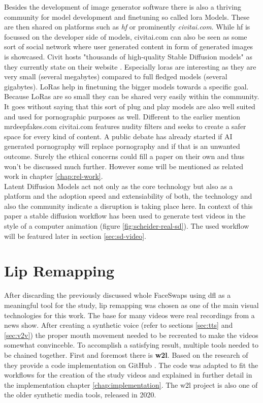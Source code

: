\documentclass[
  a4paper,  %
  twoside,  %
  bibliography=totoc,
  headsepline,
  cleardoublepage=empty,
  parskip=half,
  draft=false
]{scrbook}
\begin{document}
Besides the development of image generator software there is also a thriving community for model development and finetuning so called \gls{lora} Models. These are then shared on platforms such as \textit{\gls{hf}} or prominently \textit{civitai.com}. While \gls{hf} is focussed on the developer side of models, civitai.com can also be seen as some sort of social network where user generated content in form of generated images is showcased. Civit hosts "thousands of high-quality Stable Diffusion models" as they currently state on their website \cite{CivitaiHomeOpenSource}. Especially \gls{lora}s are interesting as they are very small (several megabytes) compared to full fledged models (several gigabytes). LoRas help in finetuning the bigger models towards a specific goal. Because LoRas are so small they can be shared very easily within the community. It goes without saying that this sort of plug and play models are also well suited and used for pornographic purposes as well. Different to the earlier mention mrdeepfakes.com civitai.com features nudity filters and seeks to create a safer space for every kind of content. A public debate has already started if AI generated pornography will replace pornography and if that is an unwanted outcome. Surely the ethical concerns could fill a paper on their own and thus won't be discussed much further. However some will be mentioned as related work in chapter \ref{chap:rel-work}.\\
Latent Diffusion Models act not only as the core technology but also as a platform and the adoption speed and extensiability of both, the technology and also the community indicate a disruption is taking place here.
In context of this paper a stable diffusion workflow has been used to generate test videos in the style of a computer animation (figure \ref{fig:scheider-real-sd}). The used workflow will be featured later in section \ref{sec:sd-video}. 

\section{Lip Remapping}
\label{sec:lips}
After discarding the previously discussed whole FaceSwaps using \gls{dfl} as a meaningful tool for the study, lip remapping was chosen as one of the main visual technologies for this work. The base for many videos were real recordings from a news show. After creating a synthetic voice (refer to sections \ref{sec:tts} and \ref{sec:v2v}) the proper mouth movement needed to be recreated to make the videos somewhat convinceble. To accomplish a satisfying result, multiple tools needed to be chained together. First and foremost there is \textbf{\gls{w2l}}. Based on the research of \citet{prajwalLipSyncExpert2020} they provide a code implementation on GitHub \cite{mukhopadhyayWav2LipAccuratelyLipsyncing2023}. The code was adapted to fit the workflows for the creation of the study videos and explained in further detail in the implementation chapter \ref{chap:implementation}. The \gls{w2l} project is also one of the older synthetic media tools, released in 2020.
\end{document}
